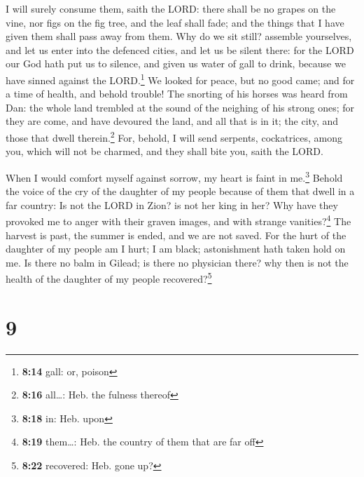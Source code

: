  I will surely consume them, saith the LORD: there shall
be no grapes on the vine, nor figs on the fig tree, and the leaf shall
fade; and the things that I have given them shall pass away from them.
 Why do we sit still? assemble yourselves, and let us
enter into the defenced cities, and let us be silent there: for the LORD
our God hath put us to silence, and given us water of gall to drink,
because we have sinned against the LORD.\footnote{\textbf{8:14} gall:
  or, poison}  We looked for peace, but no good came; and
for a time of health, and behold trouble!  The snorting
of his horses was heard from Dan: the whole land trembled at the sound
of the neighing of his strong ones; for they are come, and have devoured
the land, and all that is in it; the city, and those that dwell
therein.\footnote{\textbf{8:16} all\ldots: Heb. the fulness thereof}
 For, behold, I will send serpents, cockatrices, among
you, which will not be charmed, and they shall bite you, saith the LORD.

 When I would comfort myself against sorrow, my heart is
faint in me.\footnote{\textbf{8:18} in: Heb. upon} 
Behold the voice of the cry of the daughter of my people because of them
that dwell in a far country: Is not the LORD in Zion? is not her king in
her? Why have they provoked me to anger with their graven images, and
with strange vanities?\footnote{\textbf{8:19} them\ldots: Heb. the
  country of them that are far off}  The harvest is past,
the summer is ended, and we are not saved.  For the hurt
of the daughter of my people am I hurt; I am black; astonishment hath
taken hold on me.  Is there no balm in Gilead; is there
no physician there? why then is not the health of the daughter of my
people recovered?\footnote{\textbf{8:22} recovered: Heb. gone up?}

\hypertarget{section-8}{%
\section{9}\label{section-8}}

